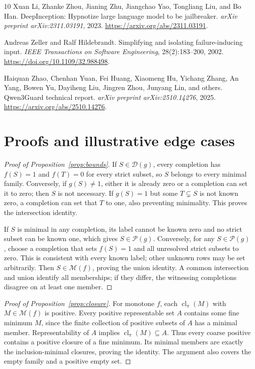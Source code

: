 \documentclass{article}
\newcommand{\Fam}{\mathcal{M}}
\newcommand{\Nec}{\mathcal{D}}
\newcommand{\Poss}{\mathcal{P}}
\newcommand{\cl}{\operatorname{cl}}
\begin{document}
\begin{thebibliography}{10}
Xuan Li, Zhanke Zhou, Jianing Zhu, Jiangchao Yao, Tongliang Liu, and Bo Han.
DeepInception: Hypnotize large language model to be jailbreaker.
\emph{arXiv preprint arXiv:2311.03191}, 2023.
\url{https://arxiv.org/abs/2311.03191}.

Andreas Zeller and Ralf Hildebrandt.
Simplifying and isolating failure-inducing input.
\emph{IEEE Transactions on Software Engineering}, 28(2):183--200, 2002.
\url{https://doi.org/10.1109/32.988498}.

Haiquan Zhao, Chenhan Yuan, Fei Huang, Xiaomeng Hu, Yichang Zhang,
An Yang, Bowen Yu, Dayiheng Liu, Jingren Zhou, Junyang Lin, and others.
Qwen3Guard technical report.
\emph{arXiv preprint arXiv:2510.14276}, 2025.
\url{https://arxiv.org/abs/2510.14276}.

\end{thebibliography}

\appendix
\section{Proofs and illustrative edge cases}
\label{app:proofs}

\begin{proof}[Proof of Proposition~\ref{prop:bounds}]
If $S\in\Nec(g)$, every completion has $f(S)=1$ and $f(T)=0$ for every
strict subset, so $S$ belongs to every minimal family. Conversely, if
$g(S)\ne1$, either it is already zero or a completion can set it to zero;
then $S$ is not necessary. If $g(S)=1$ but some $T\subsetneq S$ is not
known zero, a completion can set that $T$ to one, also preventing minimality.
This proves the intersection identity.

If $S$ is minimal in any completion, its label cannot be known zero and
no strict subset can be known one, which gives $S\in\Poss(g)$. Conversely,
for any $S\in\Poss(g)$, choose a completion that sets $f(S)=1$ and all
unresolved strict subsets to zero. This is consistent with every known label;
other unknown rows may be set arbitrarily. Then $S\in\Fam(f)$, proving
the union identity. A common intersection and union identify all memberships;
if they differ, the witnessing completions disagree on at least one member.
\end{proof}

\begin{proof}[Proof of Proposition~\ref{prop:closure}]
For monotone $f$, each $\cl_\pi(M)$ with $M\in\Fam(f)$ is positive.
Every positive representable set $A$ contains some fine minimum $M$, since
the finite collection of positive subsets of $A$ has a minimal member.
Representability of $A$ implies $\cl_\pi(M)\subseteq A$. Thus every
coarse positive contains a positive closure of a fine minimum. Its minimal
members are exactly the inclusion-minimal closures, proving the identity.
The argument also covers the empty family and a positive empty set.
\end{proof}
\end{document}
